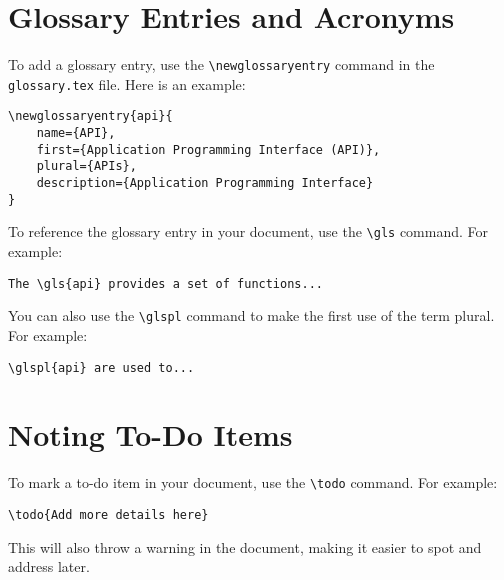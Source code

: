 \section{Glossary Entries and Acronyms}

To add a glossary entry, use the \texttt{\textbackslash newglossaryentry} command in the \texttt{glossary.tex} file. Here is an example:

\begin{verbatim}
\newglossaryentry{api}{
    name={API},
    first={Application Programming Interface (API)},
    plural={APIs},
    description={Application Programming Interface}
}
\end{verbatim}

To reference the glossary entry in your document, use the \texttt{\textbackslash gls} command. For example:

\begin{verbatim}
The \gls{api} provides a set of functions...
\end{verbatim}

You can also use the \texttt{\textbackslash glspl} command to make the first use of the term plural. For example:

\begin{verbatim}
\glspl{api} are used to...
\end{verbatim}

\section{Noting To-Do Items}

To mark a to-do item in your document, use the \texttt{\textbackslash todo} command. For example:

\begin{verbatim}
\todo{Add more details here}
\end{verbatim}

This will also throw a warning in the document, making it easier to spot and address later.